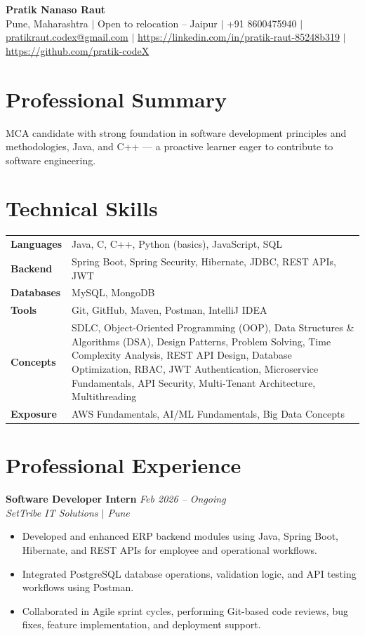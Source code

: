 \documentclass[10.5pt,a4paper]{article}
\begin{document}
\begin{center}
{\Large\bfseries Pratik Nanaso Raut}\\[2pt]
Pune, Maharashtra $|$ Open to relocation -- Jaipur $|$ +91 8600475940 $|$ \href{mailto:pratikraut.codex@gmail.com}{pratikraut.codex@gmail.com} $|$ \href{https://linkedin.com/in/pratik-raut-85248b319}{https://linkedin.com/in/pratik-raut-85248b319} $|$ \href{https://github.com/pratik-codeX}{https://github.com/pratik-codeX}
\end{center}
\vspace{-2pt}
\section{Professional Summary}
MCA candidate with strong foundation in software development principles and methodologies, Java, and C++ — a proactive learner eager to contribute to software engineering.
\section{Technical Skills}
\begin{tabular}{@{}p{}p{}@{}}
\textbf{Languages} & Java, C, C++, Python (basics), JavaScript, SQL \\[1pt]
\textbf{Backend} & Spring Boot, Spring Security, Hibernate, JDBC, REST APIs, JWT \\[1pt]
\textbf{Databases} & MySQL, MongoDB \\[1pt]
\textbf{Tools} & Git, GitHub, Maven, Postman, IntelliJ IDEA \\[1pt]
\textbf{Concepts} & SDLC, Object-Oriented Programming (OOP), Data Structures \& Algorithms (DSA), Design Patterns, Problem Solving, Time Complexity Analysis, REST API Design, Database Optimization, RBAC, JWT Authentication, Microservice Fundamentals, API Security, Multi-Tenant Architecture, Multithreading \\[1pt]
\textbf{Exposure} & AWS Fundamentals, AI/ML Fundamentals, Big Data Concepts \\
\end{tabular}
\section{Professional Experience}
\textbf{Software Developer Intern} \hfill \textit{Feb 2026 -- Ongoing}
\\\textit{SetTribe IT Solutions $|$ Pune}
\begin{itemize}
  \item Developed and enhanced ERP backend modules using Java, Spring Boot, Hibernate, and REST APIs for employee and operational workflows.
  \item Integrated PostgreSQL database operations, validation logic, and API testing workflows using Postman.
  \item Collaborated in Agile sprint cycles, performing Git-based code reviews, bug fixes, feature implementation, and deployment support.
\end{itemize}
\end{document}
